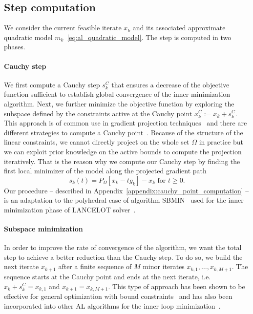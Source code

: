\documentclass{article}
\numberwithin{equation}{section}
\newcommand{\proj}[2]{P_{#1} \left[ {#2} \right]} %
\theoremstyle{plain}
\begin{document}
	\subsection{Step computation}\label{subsec:step_computation}
	
	We consider the current feasible iterate $x_k$ and its associated approximate quadratic model $m_k$~\eqref{eq:al_quadratic_model}. The step is computed in two phases. 
	
	\paragraph*{Cauchy step} We first compute a Cauchy step $s_k^C$ that ensures a decrease of the objective function sufficient to establish global convergence of the inner minimization algorithm. Next, we further minimize the objective function by exploring the subspace defined by the constraints active at the Cauchy point $x_k^C:=x_k+s_k^C$. This approach is of common use in gradient projection techniques~\cite[Chapter 16]{nocedalwright:2006} and there are different strategies to compute a Cauchy point~\cite{conn-etal:1988b,moretoraldo:1991,linmore:1999a}. Because of the structure of the linear constraints, we cannot directly project on the whole set $\Omega$ in practice but we can exploit prior knowledge on the active bounds to compute the projection iteratively. That is the reason why we compute our Cauchy step by finding the first local minimizer of the model along the projected gradient path
	\begin{equation}\label{eq:projected_gradient_path}
		s_k(t)=\proj{\Omega}{x_k-tg_k}-x_k \text{ for } t\ge 0.
	\end{equation}
	Our procedure -- described in Appendix~\ref{appendix:cauchy_point_computation} -- is an adaptation to the polyhedral case of algorithm SBMIN~\cite{conn-etal:1988b} used for the inner minimization phase of LANCELOT solver~\cite{conn-etal:1992}.
	
	\paragraph*{Subspace minimization} In order to improve the rate of convergence of the algorithm, we want the total step to achieve a better reduction than the Cauchy step. To do so, we build the next iterate $x_{k+1}$ after a finite sequence of $M$ minor iterates $x_{k,1},\ldots,x_{k,M+1}$. The sequence starts at the Cauchy point and ends at the next iterate, i.e. $x_{k}+s_k^C=x_{k,1}$ and $x_{k+1}=x_{k,M+1}$. This type of approach has been shown to be effective for general optimization with bound constraints~\cite{linmore:1999a} and has also been incorporated into other AL algorithms for the inner loop minimization~\cite{conn-etal:1992,arreckx-etal:2016}.
	
\end{document}
